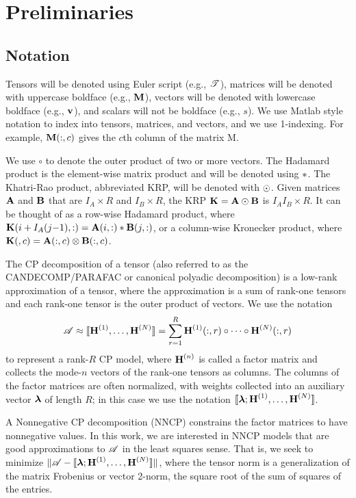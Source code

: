 
\section{Preliminaries} 
\label{sec:prelims}

\subsection{Notation}

Tensors will be denoted using Euler script (e.g., $\T{T}$), 
matrices will be denoted with uppercase boldface (e.g., $\M{M}$), vectors will be denoted with lowercase boldface  
(e.g., $\V{v}$), and scalars will not be boldface (e.g., $s$). 
We use Matlab style notation to index into tensors, matrices, and vectors, and we use 1-indexing. 
For example, $\M{M}(:,c)$ gives the $c$th column of the matrix M.

We use $\circ$ to denote the outer product of two or more vectors.
The Hadamard product is the element-wise matrix product and will be denoted using $\ast$. 
The Khatri-Rao product, abbreviated KRP, will be denoted with $\odot$. 
Given matrices $\M{A}$ and $\M{B}$ that are $I_{A} \times R$ and $I_{B} \times R$, the KRP $\M{K} = \M{A} \Khat \M{B}$ is $I_{A}I_{B} \times R$. 
It can be thought of as a row-wise Hadamard product, where $\M{K}(i+I_{A}(j{-}1),:) = \M{A}(i,:) \Hada \M{B}(j,:)$, or a column-wise Kronecker product, where $\M{K}(,c) =  \M{A}(:,c) \Kron \M{B}(:,c)$.

The CP decomposition of a tensor (also referred to as the CANDECOMP/PARAFAC or canonical polyadic decomposition) is a low-rank approximation of a tensor, where the approximation is a sum of rank-one tensors and each rank-one tensor is the outer product of vectors.
We use the notation
$$\TA \approx \CP = \sum_{r=1}^R \Mn{H}{1}(:,r) \circ \cdots \circ \Mn{H}{N}(:,r)$$
to represent a rank-$R$ CP model, where $\Mn{H}{n}$ is called a factor matrix and collects the mode-$n$ vectors of the rank-one tensors as columns.
The columns of the factor matrices are often normalized, with weights collected into an auxiliary vector $\V{\lambda}$ of length $R$; in this case we use the notation $\CPl$.

A Nonnegative CP decomposition (NNCP) constrains the factor matrices to have nonnegative values.
In this work, we are interested in NNCP models that are good approximations to $\TA$ in the least squares sense.
That is, we seek to minimize $\|\TA-\CPl\|$, where the tensor norm is a generalization of the matrix Frobenius or vector 2-norm, the square root of the sum of squares of the entries.

